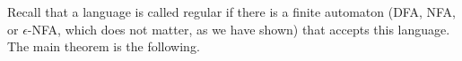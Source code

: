 

\setcounter{section}{2}
\setcounter{subsection}{1}
\setcounter{dfn}{2}



Recall that a language is called regular if there is a finite automaton (DFA, NFA, or $\epsilon$-NFA, which does not matter, as we have shown)
that accepts this language.
The main theorem is the following.


